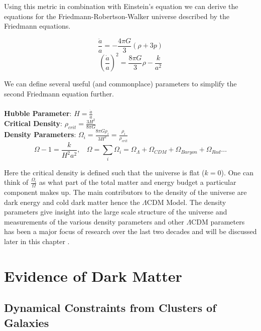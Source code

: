 	Using this metric in combination with Einstein's equation we can derive the equations for the Friedmann-Robertson-Walker universe described by the Friedmann equations.
	
	\begin{equation}
		\frac{\ddot{a}}{a} = -\frac{4 \pi G}{3} \left( \rho + 3p \right)
	\end{equation}
	\begin{equation}
		\left( \frac{\dot{a}}{a}\right)^{2} = \frac{8 \pi G}{3} \rho - \frac{k}{a^2}
	\end{equation}

	We can define several useful (and commonplace) parameters to simplify the second Friedmann equation further.
\\
\\
\textbf{Hubble Parameter}: $ H = \frac{\dot{a}}{a} $\\
\textbf{Critical Density}: $ \rho_{crit} = \frac{3H^2}{8 \pi G} $\\
\textbf{Density Parameters}: $ \Omega_{i} = \frac{8 \pi G \rho_i}{3H^2} = \frac{\rho_{i}}{\rho_{crit}} $\\
\begin{equation}
	\Omega - 1 = \frac{k}{H^2 a^2}, \ \ \ \ \Omega = \sum_{i} \Omega_{i} = \Omega_{\Lambda} + \Omega_{CDM} + \Omega_{Baryon} + \Omega_{Rad}  \ldots 
\end{equation}
	
Here the critical density is defined such that the universe is flat ($k=0$).  One can think of $\frac{\Omega_i}{\Omega}$ as what part of the total matter and energy budget a particular component makes up.  The main contributors to the density of the universe are dark energy and cold dark matter hence the $\Lambda$CDM Model.  The density parameters give insight into the large scale structure of the universe and measurements of the various density parameters and other $\Lambda$CDM parameters has been a major focus of research over the last two decades and will be discussed later in this chapter \cite{carroll1997lecture}.
	
\section{Evidence of Dark Matter}

\subsection{Dynamical Constraints from Clusters of Galaxies}

